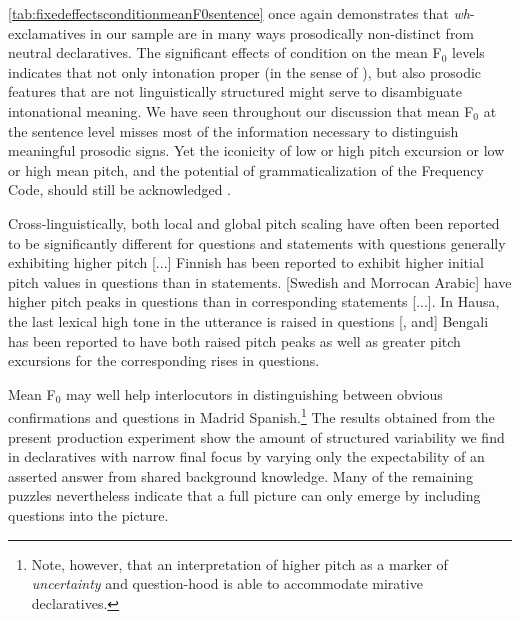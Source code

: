 \autoref{tab:fixedeffectsconditionmeanF0sentence} once again demonstrates that \textit{wh}-exclamatives in our sample are in many ways prosodically non-distinct from neutral declaratives. The significant effects of condition on the mean F$_0$ levels indicates that not only intonation proper (in the sense of \cite[4]{Ladd2008}), but also prosodic features that are not linguistically structured might serve to disambiguate intonational meaning. We have seen throughout our discussion that mean F$_0$ at the sentence level misses most of the information necessary to distinguish meaningful prosodic signs. Yet the iconicity of low or high pitch excursion or low or high mean pitch, and the potential of grammaticalization of the Frequency Code, should still be acknowledged \citep[80--84]{Gussenhoven2004}.\pagebreak

\begin{displayquote}
Cross-linguistically, both local and global pitch scaling have often been reported to be significantly different for questions and statements with questions generally exhibiting higher pitch [...] Finnish has been reported to exhibit higher initial pitch values in questions than in statements. [Swe\-dish and Morrocan Arabic] have higher pitch peaks in questions than in corresponding statements [...]. In Hausa, the last lexical high tone in the utterance is raised in questions [, and] Bengali has been reported to have both raised pitch peaks as well as greater pitch excursions for the corresponding rises in questions. \citep[65]{Roettger.2017}
\end{displayquote}

Mean F$_0$ may well help interlocutors in distinguishing between obvious confirmations and questions in Madrid Spanish.\footnote{Note, however, that an interpretation of higher pitch as a marker of \textit{uncertainty} and question-hood \citep[82]{Gussenhoven2004} is able to accommodate mirative declaratives.} The results obtained from the present production experiment show the amount of structured variability we find in declaratives with narrow final focus by varying only the expectability of an asserted answer from shared background knowledge. Many of the remaining puzzles nevertheless indicate that a full picture can only emerge by including questions into the picture.
